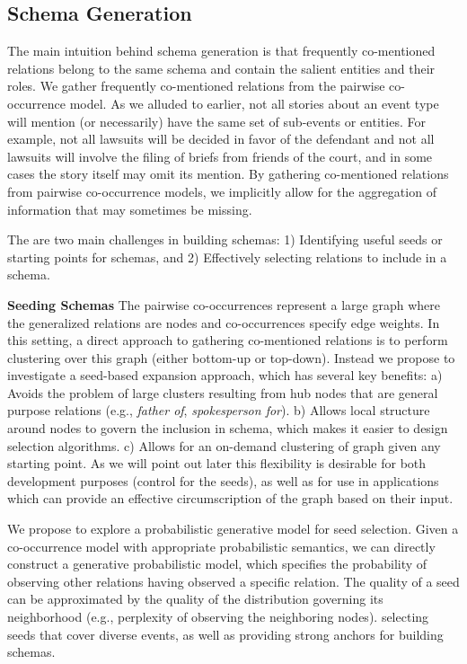 \subsection{Schema Generation}

The main intuition behind schema generation is that frequently co-mentioned relations belong to the same schema and contain the salient entities and their roles. We gather frequently co-mentioned relations from the pairwise co-occurrence model. As we alluded to earlier, not all stories about an event type will mention (or necessarily) have the same set of sub-events or entities. For example, not all lawsuits will be decided in favor of the defendant and not all lawsuits will involve the filing of briefs from friends of the court, and in some cases the story itself may omit its mention. By gathering co-mentioned relations from pairwise co-occurrence models, we implicitly allow for the aggregation of information that may sometimes be missing. 

The are two main challenges in building schemas: 1) Identifying useful seeds or starting points for schemas, and 2) Effectively selecting relations to include in a schema.

\textbf{Seeding Schemas} The pairwise co-occurrences represent a large graph where the generalized relations are nodes and co-occurrences specify edge weights. In this setting, a direct approach to gathering co-mentioned relations is to perform clustering over this graph (either bottom-up or top-down). Instead we propose to investigate a seed-based expansion approach, which has several key benefits: a) Avoids the problem of large clusters resulting from hub nodes that are general purpose relations (e.g., {\em father of}, {\em spokesperson for}). b) Allows local structure around nodes to govern the inclusion in schema, which makes it easier to design selection algorithms.  c) Allows for an on-demand clustering of graph given any starting point. As we will point out later this flexibility is desirable for both development purposes (control for the seeds), as well as for use in applications which can provide an effective circumscription of the graph based on their input.

We propose to explore a probabilistic generative model for seed selection. Given a co-occurrence model with appropriate probabilistic semantics, we can directly construct a generative probabilistic model, which specifies the probability of observing other relations having observed a specific relation. The quality of a seed can be approximated by the quality of the distribution governing its neighborhood (e.g., perplexity of observing the neighboring nodes). selecting seeds that cover diverse events, as well as providing strong anchors for building schemas. 

